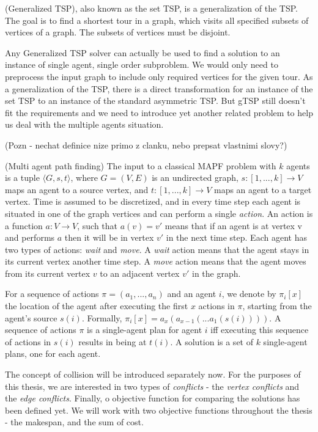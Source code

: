 \begin{definition} (Generalized TSP), also known as the set TSP, is a generalization of the TSP. 
The goal is to find a shortest tour in a graph, which visits all specified subsets of vertices of a graph. The subsets of vertices must be disjoint.
\end{definition}
Any Generalized TSP solver can actually be used to find a solution to an instance of single agent, single order subproblem. We would only need to preprocess the input graph to include only required vertices for the given tour. As a generalization of the TSP, there is a direct transformation for an instance of the set TSP to an instance of the standard asymmetric TSP. But gTSP still doesn't fit the requirements and we need to introduce yet another related problem to help us deal with the multiple agents situation.
 
 (Pozn - nechat definice nize primo z clanku, nebo prepsat vlastnimi slovy?)
 \begin{definition} (Multi agent path finding)\cite{mapf}
 The input to a classical MAPF problem with $k$ agents is a tuple $\langle G,s,t \rangle$, where $G=(V,E)$ is an undirected graph, $s : [1,...,k] \to V $ maps an agent to a source vertex, and $ t : [1,...,k] \to V$ maps an agent to a target vertex. Time is assumed to be discretized, and in every time step each agent is situated in one of the graph vertices and can perform a single \emph{action}. An action is a function $a:V \to V$, such that $ a(v) = v'$ means that if an agent is at vertex v and performs $a$ then it will be in vertex $v'$ in the next time step. Each agent has two types of actions: \emph{wait} and \emph{move}. A \emph{wait} action means that the agent stays in its current vertex another time step. A \emph{move} action means that the agent moves from its current vertex $v$ to an adjacent vertex $v'$ in the graph.
 \par
 For a sequence of actions $\pi = (a_1,...,a_n)$ and an agent $i$, we denote by $\pi_i[x]$ the location of the agent after executing the first $x$ actions in $\pi$, starting from the agent's source $s(i)$. Formally, $\pi_i[x] = a_x(a_{x-1}(...a_1(s(i))))$. A sequence of actions $\pi$ is a single-agent plan for agent $i$ iff executing this sequence of actions in $s(i)$ results in being at $t(i)$. A solution is a set of $k$ single-agent plans, one for each agent. 
 \end{definition}
 
 
 The concept of collision will be introduced separately now. For the purposes of this thesis, we are interested in two types of \emph{conflicts} - the \emph{vertex conflicts} and the \emph{edge conflicts}. Finally, o objective function for comparing the solutions has been defined yet. We will work with two objective functions throughout the thesis - the makespan, and the sum of cost.
 
